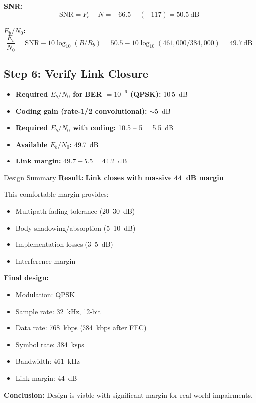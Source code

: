 \textbf{SNR:}
\begin{equation}
\mathrm{SNR} = P_r - N = -66.5 - (-117) = 50.5~\text{dB}
\end{equation}

\textbf{$E_b/N_0$:}
\begin{equation}
\frac{E_b}{N_0} = \mathrm{SNR} - 10\log_{10}(B/R_b) = 50.5 - 10\log_{10}(461{,}000/384{,}000) = 49.7~\text{dB}
\end{equation}

\subsection*{Step 6: Verify Link Closure}

\begin{itemize}
\item \textbf{Required $E_b/N_0$ for BER $= 10^{-6}$ (QPSK):} 10.5~dB
\item \textbf{Coding gain (rate-1/2 convolutional):} $\sim$5~dB
\item \textbf{Required $E_b/N_0$ with coding:} 10.5 -- 5 = 5.5~dB
\item \textbf{Available $E_b/N_0$:} 49.7~dB
\item \textbf{Link margin:} $49.7 - 5.5 = 44.2$~dB
\end{itemize}

\begin{calloutbox}{Design Summary}
\textbf{Result: Link closes with massive 44~dB margin}

This comfortable margin provides:
\begin{itemize}
\item Multipath fading tolerance (20--30~dB)
\item Body shadowing/absorption (5--10~dB)
\item Implementation losses (3--5~dB)
\item Interference margin
\end{itemize}

\textbf{Final design:}
\begin{itemize}
\item Modulation: QPSK
\item Sample rate: 32~kHz, 12-bit
\item Data rate: 768~kbps (384~kbps after FEC)
\item Symbol rate: 384~ksps
\item Bandwidth: 461~kHz
\item Link margin: 44~dB
\end{itemize}

\textbf{Conclusion:} Design is viable with significant margin for real-world impairments.
\end{calloutbox}

